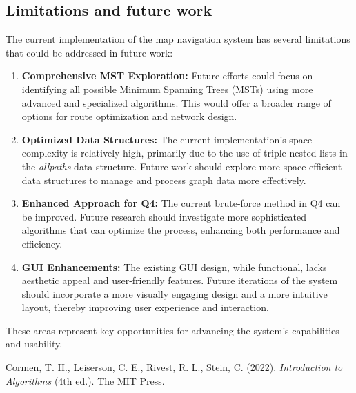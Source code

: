 \documentclass[UTF8]{ctexart}
\begin{document}
\subsection{Limitations and future work}
The current implementation of the map navigation system has several limitations that could be addressed in future work:

\begin{enumerate}
    \item \textbf{Comprehensive MST Exploration:} Future efforts could focus on identifying all possible Minimum Spanning Trees (MSTs) using more advanced and specialized algorithms. This would offer a broader range of options for route optimization and network design.

    \item \textbf{Optimized Data Structures:} The current implementation's space complexity is relatively high, primarily due to the use of triple nested lists in the \textit{allpaths} data structure. Future work should explore more space-efficient data structures to manage and process graph data more effectively.

    \item \textbf{Enhanced Approach for Q4:} The current brute-force method in Q4 can be improved. Future research should investigate more sophisticated algorithms that can optimize the process, enhancing both performance and efficiency.

    \item \textbf{GUI Enhancements:} The existing GUI design, while functional, lacks aesthetic appeal and user-friendly features. Future iterations of the system should incorporate a more visually engaging design and a more intuitive layout, thereby improving user experience and interaction.
\end{enumerate}

These areas represent key opportunities for advancing the system's capabilities and usability.

\begin{thebibliography}{9}
Cormen, T. H., Leiserson, C. E., Rivest, R. L., Stein, C. (2022). 
\textit{Introduction to Algorithms} (4th ed.). The MIT Press.
\end{thebibliography}
\end{document}
